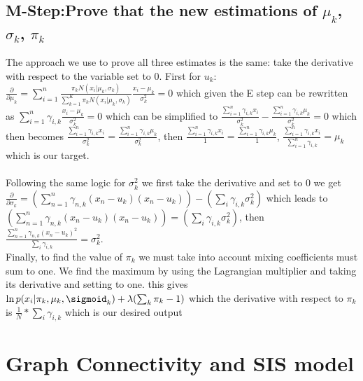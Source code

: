 \documentclass[11pt]{article}
\begin{document}
\subsection{M-Step:Prove that the new estimations of $\mu_k$, $\sigma_k$, $\pi_k$}
The approach we use to prove all three estimates is the same: take the derivative with respect to the variable set to 0. 
First for $u_k$: $\frac{\partial}{\partial \mu_k}= \sum_{i=1}^n \frac{\pi_k N(x_i| \mu_k, \sigma_k)}{\sum_{k=1}^K \pi_k N(x_i| \mu_k, \sigma_k)} \frac{x_i - \mu_k}{\sigma_k^2} = 0$ which given the E step can be rewritten as $\sum_{i=1}^n \gamma_{i,k}\frac{x_i - \mu_k}{\sigma_k^2} = 0 $ which can be simplified to $\frac{\sum_{i=1}^n \gamma_{i,k}x_i}{\sigma_k^2}  - \frac{\sum_{i=1}^n \gamma_{i,k}\mu_k}{\sigma_k^2} = 0 $ which then becomes $\frac{\sum_{i=1}^n \gamma_{i,k}x_i}{\sigma_k^2}  = \frac{\sum_{i=1}^n \gamma_{i,k}\mu_k}{\sigma_k^2}$, then $\frac{\sum_{i=1}^n \gamma_{i,k}x_i}{1}  = \frac{\sum_{i=1}^n \gamma_{i,k}\mu_k}{1}$, $\frac{\sum_{i=1}^n \gamma_{i,k}x_i}{\sum_{i=1}^n \gamma_{i,k}}  = \mu_k$ which is our target. \\\\
Following the same logic for $\sigma_k^2$ we first take the derivative and set to 0 we get $\frac{\partial }{\partial \sigma_k} =  (\sum_{n=1}^n \gamma_{n,k}(x_n-u_k)(x_n-u_k)) - (\sum_i \gamma_{i,k} \sigma_k^2)$ which leads to $(\sum_{n=1}^n \gamma_{n,k}(x_n-u_k)(x_n-u_k)) = (\sum_i \gamma_{i,k} \sigma_k^2)$, then $\frac{\sum_{n=1}^n \gamma_{n,k}(x_n-u_k)^2}{\sum_i \gamma_{i,k}} =  \sigma_k^2$. \\
Finally, to find the value of $\pi_k$ we must take into account mixing coefficients must sum to one. We find the maximum by using the Lagrangian multiplier and taking its derivative and setting to one. this gives $\ln p(x_i| \pi_k, \mu_k, \sigmoid_k) + \lambda (\sum_k \pi_k -1)$ which the derivative with respect to $\pi_k$ is $\frac{1}{N}*\sum_i \gamma_{i,k}$ which is our desired output
\section{Graph Connectivity and SIS model}
\end{document}
